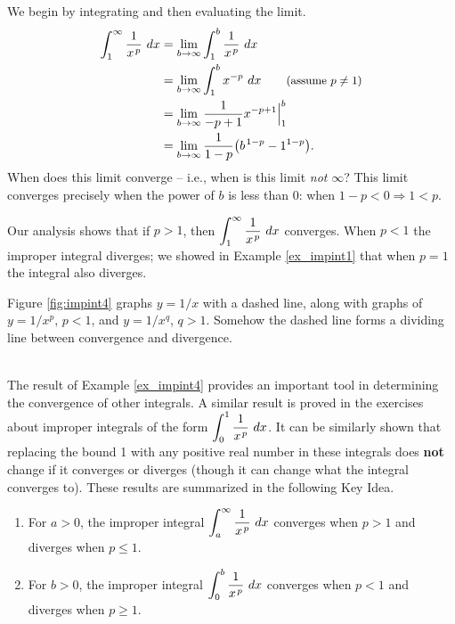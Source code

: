 {We begin by integrating and then evaluating the limit.
\begin{align*}
\int_1^\infty \frac1{x\hskip1pt ^p}\ dx &=	\lim_{b\to\infty}\int_1^b\frac1{x\hskip1pt ^p}\ dx\\
		&=	\lim_{b\to\infty}\int_1^b x^{-p}\ dx \qquad \text{\small (assume $p\neq 1$)}\\
		&= \lim_{b\to\infty} \frac{1}{-p+1}x^{-p+1}\Big|_1^b\\
		&= \lim_{b\to\infty} \frac{1}{1-p}\big(b\hskip1pt^{1-p}-1^{1-p}\big).\\
\end{align*}
When does this limit converge -- i.e., when is this limit \textit{not} $\infty$? This limit converges precisely when the power of $b$ is less than 0: when $1-p<0 \Rightarrow 1<p$. 


Our analysis shows that if $p>1$, then $\ds\int_1^\infty \frac1{x\hskip1pt ^p}\ dx $ converges. When $p<1$ the improper integral diverges; we showed in Example \ref{ex_impint1} that when $p=1$ the integral also diverges. 

Figure \ref{fig:impint4} graphs $y=1/x$ with a dashed line, along with graphs of $y=1/x^p$, $p<1$, and $y=1/x^q$, $q>1$. Somehow the dashed line forms a dividing line between convergence and divergence. %
}\\

The result of Example \ref{ex_impint4} provides an important tool in determining the convergence of other integrals. A similar result is proved in the exercises about improper integrals of the form $\displaystyle \int_0^1\frac1{x\hskip1pt ^p}\ dx$.  It can be similarly shown that replacing the bound 1 with any positive real number in these integrals does \textbf{not} change if it converges or diverges (though it can change what the integral converges to).  These results are summarized in the following Key Idea.


\setboxwidth{80pt}%
{\begin{enumerate}
\item		For $a>0$, the improper integral $\displaystyle \int_a^\infty\frac1{x\hskip1pt ^p}\ dx$ converges when $p>1$ and diverges when $p\leq 1.$
\item		For $b>0$, the improper integral $\displaystyle \int_0^b\frac1{x\hskip1pt ^p}\ dx$ converges when $p<1$ and diverges when $p\geq 1.$
\end{enumerate}
}
\restoreboxwidth


